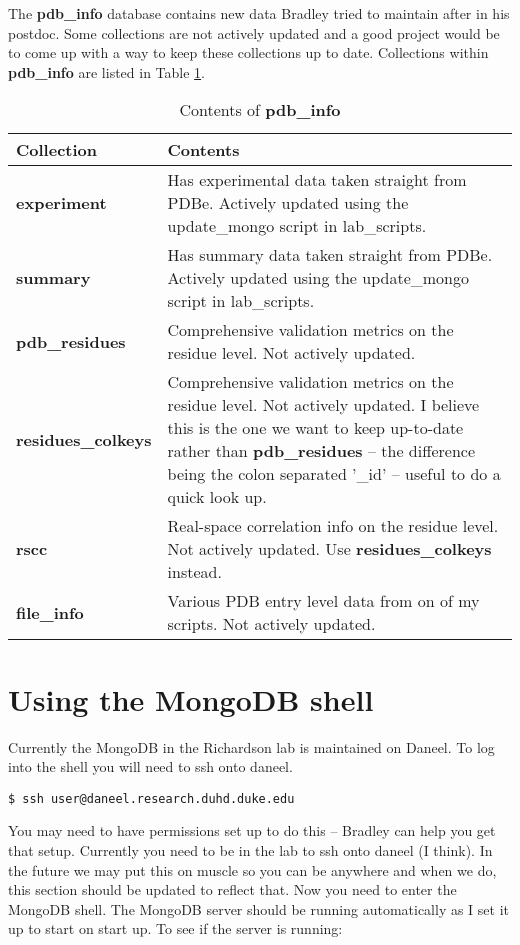 \documentclass[12pt]{article}
\newcommand{\cmdline}[1]{\vspace{5mm} \noindent
\texttt{\$ #1}
\vspace{5mm}

}
\newcommand{\mdbdb}[1]{{\color{BlueViolet}\textbf{#1}}}
\newcommand{\mdbcol}[1]{{\color{Bittersweet}\textbf{#1}}}
\begin{document}
\noindent
The \mdbdb{pdb\_info} database contains new data Bradley tried to maintain after in his postdoc.
Some collections are not actively updated and a good project would be to come up with a way to keep these collections up to date.
Collections within \mdbdb{pdb\_info} are listed in Table \ref{tab:pdbinfoDB}.
\begin{table}[h]
\caption{Contents of \mdbdb{pdb\_info}}
\begin{tabular}{l|p{9cm}}
  \textbf{Collection} & \textbf{Contents} \\ \hline
  \mdbcol{experiment} & Has experimental data taken straight from PDBe. Actively updated using the update\_mongo script in lab\_scripts. \\ \hline
  \mdbcol{summary} & Has summary data taken straight from PDBe. Actively updated using the update\_mongo script in lab\_scripts. \\ \hline
   \mdbcol{pdb\_residues} & Comprehensive validation metrics on the residue level. Not actively updated. \\ \hline
   \mdbcol{residues\_colkeys} & Comprehensive validation metrics on the residue level. Not actively updated. I believe this is the one we want to keep up-to-date rather than \mdbcol{pdb\_residues} -- the difference being the colon separated '\_id' -- useful to do a quick look up. \\ \hline
   \mdbcol{rscc} & Real-space correlation info on the residue level. Not actively updated. Use \mdbcol{residues\_colkeys} instead. \\ \hline
   \mdbcol{file\_info} & Various PDB entry level data from on of my scripts. Not actively updated. \\ \hline
\end{tabular}
\label{tab:pdbinfoDB}
\end{table}

\section{Using the MongoDB shell}
Currently the MongoDB in the Richardson lab is maintained on Daneel. 
To log into the shell you will need to ssh onto daneel.

\cmdline{ssh user@daneel.research.duhd.duke.edu}
\noindent
You may need to have permissions set up to do this -- Bradley can help you get that setup.
Currently you need to be in the lab to ssh onto daneel (I think).
In the future we may put this on muscle so you can be anywhere and when we do, this section should be updated to reflect that.
\noindent
Now you need to enter the MongoDB shell.
The MongoDB server should be running automatically as I set it up to start on start up.
To see if the server is running:
\end{document}
